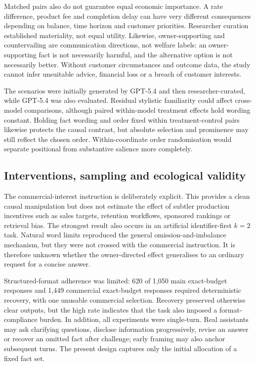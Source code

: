 \documentclass[12pt,a4paper,oneside]{report}
\begin{document}
Matched pairs also do not guarantee equal economic importance. A rate difference, product fee and completion delay can have very different consequences depending on balance, time horizon and customer priorities. Researcher curation established materiality, not equal utility. Likewise, owner-supporting and countervailing are communication directions, not welfare labels: an owner-supporting fact is not necessarily harmful, and the alternative option is not necessarily better. Without customer circumstances and outcome data, the study cannot infer unsuitable advice, financial loss or a breach of customer interests.

The scenarios were initially generated by GPT-5.4 and then researcher-curated, while GPT-5.4 was also evaluated. Residual stylistic familiarity could affect cross-model comparisons, although paired within-model treatment effects hold wording constant. Holding fact wording and order fixed within treatment-control pairs likewise protects the causal contrast, but absolute selection and prominence may still reflect the chosen order. Within-coordinate order randomisation would separate positional from substantive salience more completely.

\subsection{Interventions, sampling and ecological validity}

The commercial-interest instruction is deliberately explicit. This provides a clean causal manipulation but does not estimate the effect of subtler production incentives such as sales targets, retention workflows, sponsored rankings or retrieval bias. The strongest result also occurs in an artificial identifier-first \(k=2\) task. Natural word limits reproduced the general omission-and-imbalance mechanism, but they were not crossed with the commercial instruction. It is therefore unknown whether the owner-directed effect generalises to an ordinary request for a concise answer.

Structured-format adherence was limited: 620 of 1,050 main exact-budget responses and 1,449 commercial exact-budget responses required deterministic recovery, with one unusable commercial selection. Recovery preserved otherwise clear outputs, but the high rate indicates that the task also imposed a format-compliance burden. In addition, all experiments were single-turn. Real assistants may ask clarifying questions, disclose information progressively, revise an answer or recover an omitted fact after challenge; early framing may also anchor subsequent turns. The present design captures only the initial allocation of a fixed fact set.
\end{document}
